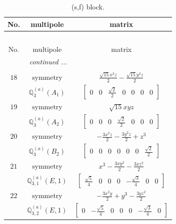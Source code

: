 \documentclass[fleqn,8pt,landscape]{jsarticle}
\begin{document}
\begin{longtable}{ccc}
\caption{(s,f) block.}
 \\
 \hline \hline
No. & multipole & matrix \\ \hline \endfirsthead

\multicolumn{2}{l}{\tablename\ \thetable{}} \\
 \hline \hline
No. & multipole & matrix \\ \hline \endhead

 \hline \hline
\multicolumn{2}{r}{\footnotesize\it continued ...} \\ \endfoot

 \hline \hline
\multicolumn{2}{r}{} \\ \endlastfoot

$ 18 $ & $ \text{symmetry} $ & $ \frac{\sqrt{15} x^{2} z}{2} - \frac{\sqrt{15} y^{2} z}{2} $ \\
$  $ & $ \mathbb{Q}_{3}^{(a)}(A_{1}) $ & $ \begin{bmatrix} 0 & 0 & \frac{\sqrt{2}}{2} & 0 & 0 & 0 & 0 \end{bmatrix} $ \\ \hline
$ 19 $ & $ \text{symmetry} $ & $ \sqrt{15} x y z $ \\
$  $ & $ \mathbb{Q}_{3}^{(a)}(A_{2}) $ & $ \begin{bmatrix} 0 & 0 & 0 & \frac{\sqrt{2}}{2} & 0 & 0 & 0 \end{bmatrix} $ \\ \hline
$ 20 $ & $ \text{symmetry} $ & $ - \frac{3 x^{2} z}{2} - \frac{3 y^{2} z}{2} + z^{3} $ \\
$  $ & $ \mathbb{Q}_{3}^{(a)}(B_{2}) $ & $ \begin{bmatrix} 0 & 0 & 0 & 0 & 0 & 0 & \frac{\sqrt{2}}{2} \end{bmatrix} $ \\ \hline
$ 21 $ & $ \text{symmetry} $ & $ x^{3} - \frac{3 x y^{2}}{2} - \frac{3 x z^{2}}{2} $ \\
$  $ & $ \mathbb{Q}_{3,1}^{(a)}(E,1) $ & $ \begin{bmatrix} \frac{\sqrt{5}}{4} & 0 & 0 & 0 & - \frac{\sqrt{3}}{4} & 0 & 0 \end{bmatrix} $ \\ \hline
$ 22 $ & $ \text{symmetry} $ & $ - \frac{3 x^{2} y}{2} + y^{3} - \frac{3 y z^{2}}{2} $ \\
$  $ & $ \mathbb{Q}_{3,2}^{(a)}(E,1) $ & $ \begin{bmatrix} 0 & - \frac{\sqrt{5}}{4} & 0 & 0 & 0 & - \frac{\sqrt{3}}{4} & 0 \end{bmatrix} $ \\ \hline

\end{longtable}
\end{document}
